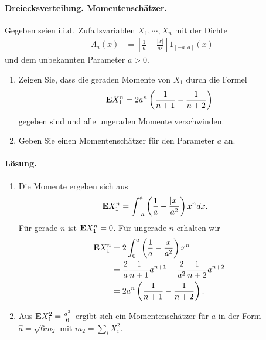 \paragraph{Dreiecksverteilung. Momentenschätzer.} Gegeben seien
i.i.d.\ Zufallsvariablen $X_1,\cdots, X_n$ mit der Dichte 
\begin{align*}
    \Lambda_a(x) &= \left[ \frac{1}{a} - \frac{|x|}{a^2} \right] 1_{[-a,a]}(x)
\end{align*}
und dem unbekannten Parameter $a>0$. 
\begin{enumerate}
    \item Zeigen Sie, dass die geraden Momente von $X_1$ durch die Formel
        \begin{equation*}
            \mathbf{E} X_1^n = 2 a^n \left( \frac{1}{n+1} - \frac{1}{n+2} \right)
        \end{equation*}
        gegeben sind und alle ungeraden Momente verschwinden. 
    \item Geben Sie einen Momentenschätzer für den Parameter $a$ an.
\end{enumerate}

\paragraph*{Lösung.} 
\begin{enumerate}
    \item Die Momente ergeben sich aus
        \begin{align*}
            \mathbf{E} X_1^n &= \int_{-a}^{a} \left( \frac{1}{a} - \frac{|x|}{a^2} \right) x^n dx.
        \end{align*}
        Für gerade $n$ ist $\mathbf{E} X_1^n=0$. Für ungerade $n$ erhalten wir
        \begin{align*}
            \mathbf{E} X_1^{n} &= 2 \int_{0}^{a} \left( \frac{1}{a} - \frac{x}{a^2} \right) x^{n} \\
            &= \frac{2}{a} \frac{1}{n+1} a^{n+1} - \frac{2}{a^2} \frac{1}{n+2}a^{n+2} \\
            &= 2 a^{n} \left( \frac{1}{n+1}- \frac{1}{n+2} \right).
        \end{align*}
    \item Aus $\mathbf{E} X_1^2 = \frac{a^2}{6}$ ergibt sich ein Momentenschätzer für
        $a$ in der Form $\hat a = \sqrt{6 m_2}$ mit $m_2 = \sum_{i}^{} X_i^2$. 
\end{enumerate}





